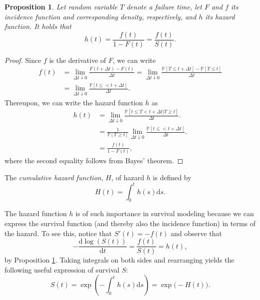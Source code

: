 \documentclass[11pt]{article}
\renewcommand{\P}{\mathbb{P}}
\renewcommand{\d}{\text{d}}
\newtheorem{proposition}[theorem]{Proposition}
\begin{document}
\begin{proposition} \label{prop:hazard}
Let random variable $T$ denote a failure time, let $F$ and $f$ its incidence function and corresponding density, respectively, and $h$ its hazard function. It holds that
\[
	h(t) = \frac{f(t)}{1 - F(t)} = \frac{f(t)}{S(t)}.
\]
\end{proposition}
\begin{proof}
Since $f$ is the derivative of $F$, we can write
\begin{align*}
	f(t) 
	&=
	\lim_{\Delta t\downarrow 0} \frac{F(t + \Delta t) - F(t)}{\Delta t}
	=
	\lim_{\Delta t\downarrow 0} \frac{\P[ T \leq t + \Delta t] - \P[T \leq t]}{\Delta t}
	\\
	&=
	\lim_{\Delta t\downarrow 0} \frac{\P[t \leq < t + \Delta t]}{\Delta t}.
\end{align*}
Thereupon, we can write the hazard function $h$ as
\begin{align*}
	h(t) 
	&=
	\lim_{\Delta t\downarrow 0}\frac{\P[t \leq T < t + \Delta t| T \geq t]}{\Delta t}.
	\\
	&=
	\frac{1}{\P[T \geq t]}
	\lim_{\Delta t\downarrow 0} \frac{\P[t \leq < t + \Delta t]}{\Delta t}.
	\\
	&=
	\frac{f(t)}{1 - F(t)},
\end{align*}
where the second equality follows from Bayes' theorem.
\end{proof}

The \textit{cumulative hazard function}, $H$, of hazard $h$ is defined by
\[
    H(t) = \int_0^t h(s) \d s.
\]

The hazard function $h$ is of such importance in survival modeling because we can express the survival function (and thereby also the incidence function) in terms of the hazard. To see this, notice that $S'(t) = -f(t)$ and observe that
\[
	- \frac{\d \log(S(t))}{\d t} = \frac{f(t)}{S(t)} = h(t),
\]
by Proposition \ref{prop:hazard}. Taking integrals on both sides and rearranging yields the following useful expression of survival $S$:
\[
	S(t) = \exp \left( - \int_0^t h(s) \d s \right) = \exp \big( - H(t) \big).
\]
\end{document}
